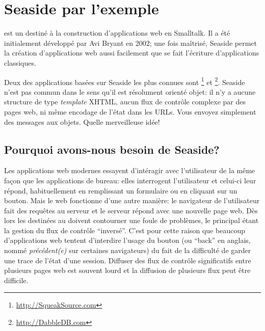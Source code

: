 \documentclass[a4paper,10pt,twoside]{book}
\begin{document}
	\sloppy
\fi
\chapter{Seaside par l'exemple}


 est un \framework destiné à la construction
d'applications web en Smalltalk. 
Il a été initialement développé par Avi Bryant  
en 2002; 
une fois maîtrisé, Seaside permet la création d'applications
web aussi facilement que se fait l'écriture d'applications classiques.

Deux des applications basées sur Seaside les plus connues sont 
 \footnote{\url{http://SqueakSource.com}} et \footnote{\url{http://DabbleDB.com}}.
Seaside n'est pas commun dans le sens qu'il est résolument orienté
objet: il n'y a aucune structure de type \emph{template} XHTML, aucun
flux de contrôle complexe par des pages web, ni même encodage de
l'état dans les URLs. Vous envoyez simplement des messages aux
objets. Quelle merveilleuse idée!

\section{Pourquoi avons-nous besoin de Seaside?}

Les applications web modernes essayent d'intéragir avec l'utilisateur
de la même façon que les applications de bureau: elles interrogent
l'utilisateur et celui-ci leur répond, habituellement en remplissant
un formulaire ou en cliquant sur un bouton.
Mais le web fonctionne d'une autre manière: le navigateur de
l'utilisateur fait des requêtes au serveur et le serveur répond avec
une nouvelle page web.
Dès lors les \frameworks destinées au
 doivent contourner une foule de
problèmes, le principal étant la gestion du flux de contrôle ``inversé''.
C'est pour cette raison que beaucoup d'applications web tentent
d'interdire l'usage du bouton \backbtn (ou ``back'' en anglais, nommé
\emph{précédent(e)} sur certaines navigateurs) du fait de la
difficulté de garder une trace de l'état d'une session.
Diffuser des flux de contrôle significatifs entre plusieurs pages web 
est souvent lourd et la diffusion de plusieurs flux peut être difficile.
\end{document}
